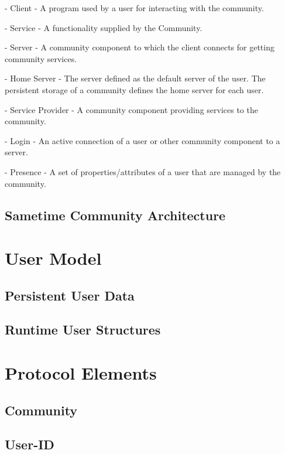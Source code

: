 \documentclass[titlepage,oneside]{book}
\begin{document}
\par{} - Client - A program used by a user for interacting with the
community.

\par{} - Service - A functionality supplied by the Community.

\par{} - Server - A community component to which the client connects
for getting community services.

\par{} - Home Server - The server defined as the default server of the
user.  The persistent storage of a community defines the home server
for each user.

\par{} - Service Provider - A community component providing services
to the community.

\par{} - Login - An active connection of a user or other community
component to a server.

\par{} - Presence - A set of properties/attributes of a user that are
managed by the community.

\section{Sametime Community Architecture}

\chapter{User Model}
\section{Persistent User Data}
\section{Runtime User Structures}

\chapter{Protocol Elements}
\section{Community}
\section{User-ID}
\end{document}
